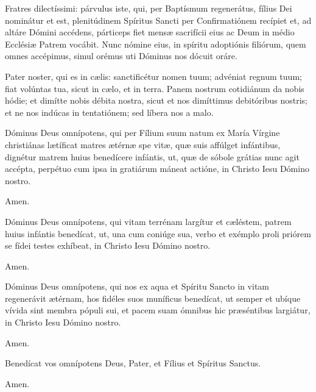 

Fratres dilectíssimi: párvulus iste, qui, per Baptísmum regenerátus,
fílius Dei nominátur et est, plenitúdinem Spíritus
Sancti per Confirmatiónem recípiet et, ad altáre Dómini accédens,
párticeps fiet mensæ sacrifícii eius ac Deum in médio
Ecclésiæ Patrem vocábit. Nunc nómine eius, in spíritu adoptiónis
filiórum, quem omnes accépimus, simul orémus uti Dóminus nos dócuit
oráre.

Pater noster, qui es in cælis:
sanctificétur nomen tuum;
advéniat regnum tuum;
fiat volúntas tua, sicut in cælo, et in terra.
Panem nostrum cotidiánum da nobis hódie;
et dimítte nobis débita nostra,
sicut et nos dimíttimus debitóribus nostris;
et ne nos indúcas in tentatiónem;
sed líbera nos a malo.



 Dóminus Deus omnípotens, qui per Fílium suum natum ex María Vírgine christiánas
lætíficat matres ætérnæ spe vitæ, quæ suis affúlget infántibus, dignétur matrem huius
benedícere infántis, ut, quæ de sóbole grátias nunc agit accépta, perpétuo cum ipsa
in gratiárum máneat actióne, in Christo Iesu Dómino nostro.

 Amen.

 Dóminus Deus omnípotens, qui vitam terrénam largítur et cæléstem, patrem huius infántis
benedícat, ut, una cum coniúge sua, verbo et exémplo proli priórem se fídei testes exhíbeat,
in Christo Iesu Dómino nostro.

 Amen.

 Dóminus Deus omnípotens, qui nos ex aqua et Spíritu Sancto in vitam regenerávit
ætérnam, hos fidéles suos muníficus benedícat, ut semper et ubíque vívida sint membra pópuli sui,
et pacem suam ómnibus hic præséntibus largiátur, in Christo Iesu Dómino nostro.

 Amen.

 Benedícat vos omnípotens Deus,
Pater, et Fílius \grecross{} et Spíritus Sanctus.

 Amen.
